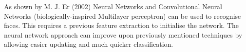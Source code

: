 As shown by M. J. Er (2002)
\cite{RBF_NN}\cite{CNN}Neural Networks and Convolutional Neural Networks (biologically-inspired Multilayer perceptron) can be used to recognise faces. This requires a previous feature extraction to initialise the network. The neural network approach can improve upon previously mentioned techniques by allowing easier updating and much quicker classification.


	


